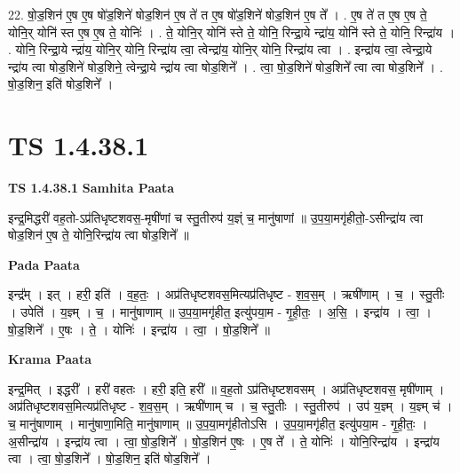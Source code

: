\documentclass[17pt]{extarticle}
\begin{document}
22. षो॒ड॒शिन॑ ए॒ष ए॒ष षो॑ड॒शिने॑ षोड॒शिन॑ ए॒ष ते॑ त ए॒ष षो॑ड॒शिने॑ षोड॒शिन॑ ए॒ष ते᳚ । . ए॒ष ते॑ त ए॒ष ए॒ष ते॒ योनि॒र् योनि॑ स्त ए॒ष ए॒ष ते॒ योनिः॑ । . ते॒ योनि॒र् योनि॑ स्ते ते॒ योनि॒ रिन्द्रा॒ये न्द्रा॑य॒ योनि॑ स्ते ते॒ योनि॒ रिन्द्रा॑य । . योनि॒ रिन्द्रा॒ये न्द्रा॑य॒ योनि॒र् योनि॒ रिन्द्रा॑य त्वा॒ त्वेन्द्रा॑य॒ योनि॒र् योनि॒ रिन्द्रा॑य त्वा । . इन्द्रा॑य त्वा॒ त्वेन्द्रा॒ये न्द्रा॑य त्वा षोड॒शिने॑ षोड॒शिने॒ त्वेन्द्रा॒ये न्द्रा॑य त्वा षोड॒शिने᳚ । . त्वा॒ षो॒ड॒शिने॑ षोड॒शिने᳚ त्वा त्वा षोड॒शिने᳚ । . षो॒ड॒शिन॒ इति॑ षोड॒शिने᳚ । \newline
\pagebreak
{}

\section{ TS 1.4.38.1 }

\textbf{TS 1.4.38.1 } \newline
\textbf{Samhita Paata} \newline

इन्द्र॒मिद्धरी॑ वह॒तो-ऽप्र॑तिधृष्टशवस॒-मृषी॑णां च स्तु॒तीरुप॑ य॒ज्ञ्ं च॒ मानु॑षाणां ॥ उ॒प॒या॒मगृ॑हीतो॒-ऽसीन्द्रा॑य त्वा षोड॒शिन॑ ए॒ष ते॒ योनि॒रिन्द्रा॑य त्वा षोड॒शिने᳚ ॥ \newline

\textbf{Pada Paata} \newline

इन्द्र᳚म् । इत् । हरी॒ इति॑ । व॒ह॒तः॒ । अप्र॑तिधृष्टशवस॒मित्यप्र॑तिधृष्ट - श॒व॒स॒म् । ऋषी॑णाम् । च॒ । स्तु॒तीः । उपेति॑ । य॒ज्ञ्म् । च॒ । मानु॑षाणाम् ॥ उ॒प॒या॒मगृ॑हीत॒ इत्यु॑पया॒म - गृ॒ही॒तः॒ । अ॒सि॒ । इन्द्रा॑य । त्वा॒ । षो॒ड॒शिने᳚ । ए॒षः । ते॒ । योनिः॑ । इन्द्रा॑य । त्वा॒ । षो॒ड॒शिने᳚ ॥  \newline


\textbf{Krama Paata} \newline

इन्द्र॒मित् । इद्धरी᳚ । हरी॑ वहतः । हरी॒ इति॒ हरी᳚ ॥ व॒ह॒तो ऽप्र॑तिधृष्टशवसम् । 
अप्र॑तिधृष्टशवस॒ मृषी॑णाम् । अप्र॑तिधृष्टशवस॒मित्यप्र॑तिधृष्ट - श॒व॒स॒म् । ऋषी॑णाम् च । च॒ स्तु॒तीः । स्तु॒तीरुप॑ । उप॑ य॒ज्ञ्म् । य॒ज्ञ्म् च॑ । च॒ मानु॑षाणाम् । मानु॑षाणा॒मिति॒ मानु॑षाणाम् ॥ उ॒प॒या॒मगृ॑हीतोऽसि । उ॒प॒या॒मगृ॑हीत॒ इत्यु॑पया॒म - गृ॒ही॒तः॒ । अ॒सीन्द्रा॑य । इन्द्रा॑य त्वा । त्वा॒ षो॒ड॒शिने᳚ । षो॒ड॒शिन॑ ए॒षः । ए॒ष ते᳚ । ते॒ योनिः॑ । योनि॒रिन्द्रा॑य । इन्द्रा॑य त्वा । त्वा॒ षो॒ड॒शिने᳚ । षो॒ड॒शिन॒ इति॑ षोड॒शिने᳚ । \newline
\end{document}
